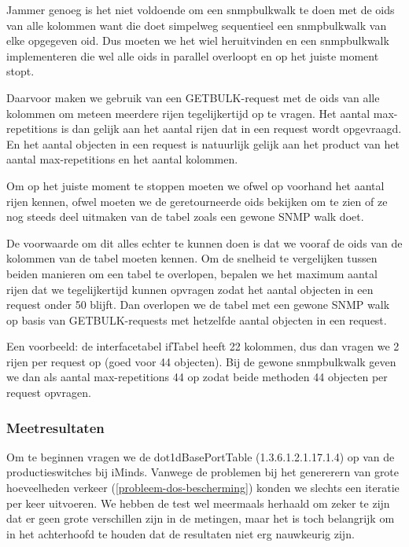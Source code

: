 Jammer genoeg is het niet voldoende om een snmpbulkwalk te doen met de \glspl{oid} van alle kolommen want
die doet simpelweg sequentieel een snmpbulkwalk van elke opgegeven \gls{oid}.
Dus moeten we het wiel heruitvinden en een snmpbulkwalk implementeren die wel alle \glspl{oid} in parallel overloopt en op het juiste moment stopt.

Daarvoor maken we gebruik van een GETBULK-request met de \glspl{oid} van alle kolommen om meteen meerdere rijen tegelijkertijd op te vragen.
Het aantal max-repetitions is dan gelijk aan het aantal rijen dat in een request wordt opgevraagd.
En het aantal objecten in een request is natuurlijk gelijk aan het product van het aantal max-repetitions en het aantal kolommen.

Om op het juiste moment te stoppen moeten we ofwel op voorhand het aantal rijen kennen, ofwel moeten we de geretourneerde \glspl{oid}
bekijken om te zien of ze nog steeds deel uitmaken van de tabel zoals een gewone SNMP walk doet.

De voorwaarde om dit alles echter te kunnen doen is dat we vooraf de \glspl{oid} van de kolommen van de tabel moeten kennen.
Om de snelheid te vergelijken tussen beiden manieren om een tabel te overlopen,
bepalen we het maximum aantal rijen dat we tegelijkertijd kunnen opvragen zodat het aantal objecten in een request onder 50 blijft.
Dan overlopen we de tabel met een gewone SNMP walk op basis van GETBULK-requests met hetzelfde aantal objecten in een request.

Een voorbeeld: de interfacetabel ifTabel heeft 22 kolommen, dus dan vragen we 2 rijen per request op (goed voor 44 objecten).
Bij de gewone snmpbulkwalk geven we dan als aantal max-repetitions 44 op zodat beide methoden 44 objecten per request opvragen.

\subsubsection{Meetresultaten}

Om te beginnen vragen we de dot1dBasePortTable (1.3.6.1.2.1.17.1.4) op van de productieswitches bij iMinds.
Vanwege de problemen bij het genererern van grote hoeveelheden verkeer (\cref{probleem-dos-bescherming}) konden we slechts een iteratie per keer uitvoeren.
We hebben de test wel meermaals herhaald om zeker te zijn dat er geen grote verschillen zijn in de metingen,
maar het is toch belangrijk om in het achterhoofd te houden dat de resultaten niet erg nauwkeurig zijn.

